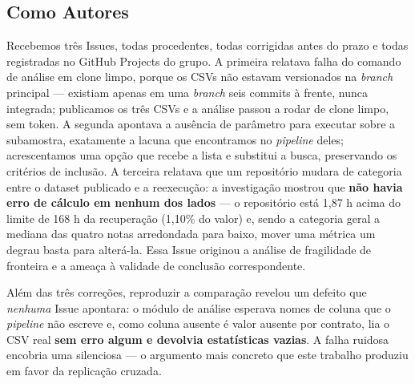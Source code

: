\subsection{Como Autores}

Recebemos três Issues, todas procedentes, todas corrigidas antes do prazo e todas registradas
no GitHub Projects do grupo. A primeira relatava falha do comando de análise em clone limpo,
porque os CSVs não estavam versionados na \emph{branch} principal --- existiam apenas em uma
\emph{branch} seis commits à frente, nunca integrada; publicamos os três CSVs e a análise
passou a rodar de clone limpo, sem token. A segunda apontava a ausência de parâmetro para
executar sobre a subamostra, exatamente a lacuna que encontramos no \emph{pipeline} deles;
acrescentamos uma opção que recebe a lista e substitui a busca, preservando os critérios de
inclusão. A terceira relatava que um repositório mudara de categoria entre o dataset
publicado e a reexecução: a investigação mostrou que \textbf{não havia erro de cálculo em
nenhum dos lados} --- o repositório está 1,87 h acima do limite de 168 h da recuperação
(1,10\% do valor) e, sendo a categoria geral a mediana das quatro notas arredondada para
baixo, mover uma métrica um degrau basta para alterá-la. Essa Issue originou a análise de
fragilidade de fronteira e a ameaça à validade de conclusão correspondente.

Além das três correções, reproduzir a comparação revelou um defeito que \emph{nenhuma} Issue
apontara: o módulo de análise esperava nomes de coluna que o \emph{pipeline} não escreve e,
como coluna ausente é valor ausente por contrato, lia o CSV real \textbf{sem erro algum e
devolvia estatísticas vazias}. A falha ruidosa encobria uma silenciosa --- o argumento mais
concreto que este trabalho produziu em favor da replicação cruzada.
